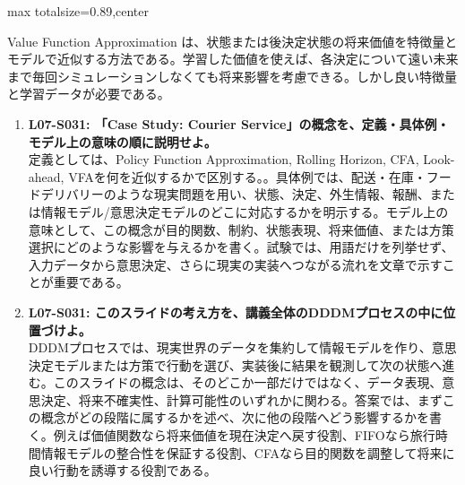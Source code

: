 \begin{minipage}[t]{0.58\textwidth}
\begin{adjustbox}{max totalsize={\textwidth}{0.89\textheight},center}
\begin{minipage}{\textwidth}
Value Function Approximation は、状態または後決定状態の将来価値を特徴量とモデルで近似する方法である。学習した価値を使えば、各決定について遠い未来まで毎回シミュレーションしなくても将来影響を考慮できる。しかし良い特徴量と学習データが必要である。\par{}\begin{enumerate}\item \textbf{L07-S031: 「Case Study: Courier Service」の概念を、定義・具体例・モデル上の意味の順に説明せよ。}\\定義としては、Policy Function Approximation, Rolling Horizon, CFA, Look-ahead, VFAを何を近似するかで区別する。。具体例では、配送・在庫・フードデリバリーのような現実問題を用い、状態、決定、外生情報、報酬、または情報モデル/意思決定モデルのどこに対応するかを明示する。モデル上の意味として、この概念が目的関数、制約、状態表現、将来価値、または方策選択にどのような影響を与えるかを書く。試験では、用語だけを列挙せず、入力データから意思決定、さらに現実の実装へつながる流れを文章で示すことが重要である。\item \textbf{L07-S031: このスライドの考え方を、講義全体のDDDMプロセスの中に位置づけよ。}\\DDDMプロセスでは、現実世界のデータを集約して情報モデルを作り、意思決定モデルまたは方策で行動を選び、実装後に結果を観測して次の状態へ進む。このスライドの概念は、そのどこか一部だけではなく、データ表現、意思決定、将来不確実性、計算可能性のいずれかに関わる。答案では、まずこの概念がどの段階に属するかを述べ、次に他の段階へどう影響するかを書く。例えば価値関数なら将来価値を現在決定へ戻す役割、FIFOなら旅行時間情報モデルの整合性を保証する役割、CFAなら目的関数を調整して将来に良い行動を誘導する役割である。\end{enumerate}
\end{minipage}
\end{adjustbox}
\end{minipage}


